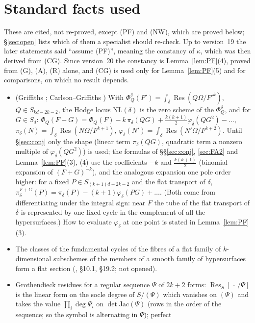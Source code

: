 \documentclass[11pt]{article}
\numberwithin{equation}{section}
\theoremstyle{remark}
\newcommand{\NL}{\mathrm{NL}}
\newcommand{\Res}{\operatorname{Res}}
\begin{document}
\section{Standard facts used}\label{sec:facts}

These are cited, not re-proved, except (PF) and (NW), which are proved below; \S\ref{sec:open} lists which of
them a specialist should re-check. Up to version~19 the later statements said ``assume (PF)'', meaning the
constancy of $\kappa$, which was then derived from (CG). Since version~20 the constancy is
Lemma~\ref{lem:PF}(4), proved from (G), (A), (R) alone, and (CG) is used only for Lemma~\ref{lem:PF}(5) and for
comparisons, on which no result depends.
\begin{itemize}
\item[(G)] (Griffiths \cite{Gr}; Carlson--Griffiths \cite{CG}) With
$\Phi^\delta_Q(F')=\int_\delta\Res(Q\Omega/F'^k)$, $Q\in S_{kd-2k-2}$, the Hodge locus $\NL(\delta)$ is the zero
scheme of the $\Phi^\delta_Q$, and for $G\in S_d$:
$\Phi_Q(F+G)=\Phi_Q(F)-k\,\pi_\delta(QG)+\tfrac{k(k+1)}2\varphi_\delta(QG^2)-\dots$,
$\pi_\delta(N)=\int_\delta\Res(N\Omega/F^{k+1})$, $\varphi_\delta(N')=\int_\delta\Res(N'\Omega/F^{k+2})$. Until
\S\ref{sec:conj} only the shape (linear term $\pi_\delta(QG)$, quadratic term a nonzero multiple of
$\varphi_\delta(QG^2)$) is used; the formulas of \S\S\ref{sec:conj}, \ref{sec:FA2} and Lemma~\ref{lem:PF}(3), (4) use the
coefficients $-k$ and $\frac{k(k+1)}2$ (binomial expansion of $(F+G)^{-k}$), and the analogous expansion one pole
order higher: for a fixed $P\in S_{(k+1)d-2k-2}$ and the flat transport of $\delta$,
$\pi^{F+G}_\delta(P)=\pi_\delta(P)-(k+1)\varphi_\delta(PG)+\dots$. (Both come from differentiating under the integral
sign: near $F$ the tube of the flat transport of $\delta$ is represented by one fixed cycle in the complement of
all the hypersurfaces.) How to evaluate $\varphi_\delta$ at one
point is stated in Lemma~\ref{lem:PF}(3).
\item[(A)] The classes of the fundamental cycles of the fibres of a flat family of $k$-dimensional subschemes
of the members of a smooth family of hypersurfaces form a flat section (\cite{Fu}, \S10.1, \S19.2; not opened).
\item[(R)] Grothendieck residues for a regular sequence $\Psi$ of $2k+2$ forms: $\Res_S[\,\cdot\,/\Psi]$ is the
linear form on the socle degree of $S/(\Psi)$ which vanishes on $(\Psi)$ and takes the value $\prod_i\deg\Psi_i$ on
$\det\mathrm{Jac}(\Psi)$ (rows in the order of the sequence; so the symbol is alternating in $\Psi$); perfect

\end{itemize}
\end{document}
